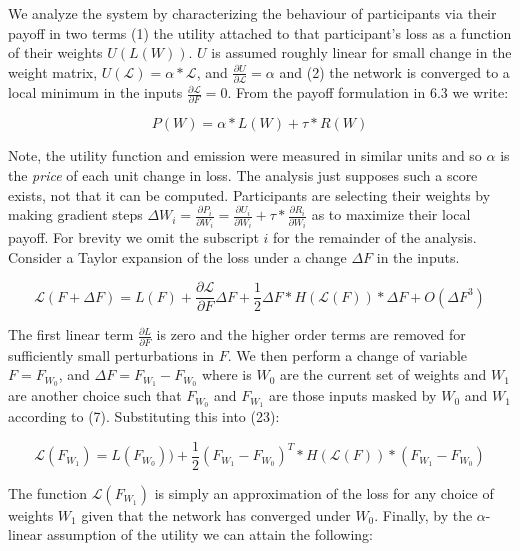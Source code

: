 \documentclass{article}
\begin{document}
We analyze the system by characterizing the behaviour of participants via their payoff in two terms (1) the utility attached to that participant’s loss as a function of their weights $U(L(W))$. $U$ is assumed roughly linear for small change in the weight matrix, $U(\mathcal{L}) = \alpha*\mathcal{L}$, and $\frac{\partial U}{\partial \mathcal{L}} = \alpha$ and (2) the network is converged to a local minimum in the inputs $\frac{\partial\mathcal{L}}{\partial F} = 0$. From the payoff formulation in 6.3 we write:
\smallskip

\begin{equation}
P(W) = \alpha * L(W) + \tau * R(W)
\end{equation}
\smallskip

Note, the utility function and emission were measured in similar units and so $\alpha$ is the \textit{price} of each unit change in loss. The analysis just supposes such a score exists, not that it can be computed. Participants are selecting their weights by making gradient steps $\Delta W_i = \frac{\partial P_i}{\partial W_i} = \frac{\partial U_i}{\partial W_i} + \tau * \frac{\partial R_i}{\partial W_i}$ as to maximize their local payoff. For brevity we omit the subscript $i$ for the remainder of the analysis. Consider a Taylor expansion of the loss under a change $\Delta F$ in the inputs.

\begin{equation}
\mathcal{L}(F + \Delta F) = L(F) + \frac{\partial \mathcal{L}}{\partial F} \Delta F + \frac{1}{2} \Delta F * H( \mathcal{L} (F) ) * \Delta F + O(\Delta F^3) 
\end{equation}

The first linear term $\frac{\partial L}{\partial F}$ is zero and the higher order terms are removed for sufficiently small perturbations in $F$. We then perform a change of variable $F = F_{W_0}$, and $\Delta F = F_{W_1} - F_{W_0}$ where is $W_0$ are the current set of weights and $W_1$ are another choice such that $F_{W_0}$ and $F_{W_1}$ are those inputs masked by $W_0$ and $W_1$ according to (7). Substituting this into (23):

\begin{equation}
\mathcal{L}(F_{W_1}) = L(F_{W_0})) + \frac{1}{2} (F_{W_1} - F_{W_0})^T * H( \mathcal{L}(F)) * (F_{W_1} - F_{W_0}) 
\end{equation}

The function $\mathcal{L}(F_{W_1})$ is simply an approximation of the loss for any choice of weights $W_1$ given that the network has converged under $W_0$. Finally, by the $\alpha$-linear assumption of the utility we can attain the following: 
\end{document}
